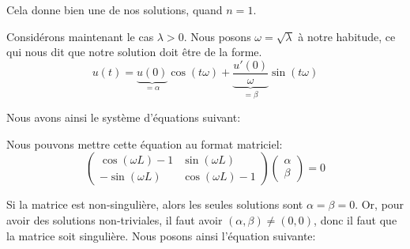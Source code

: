 \documentclass[a4paper]{article}
\begin{document}
{{        Cela donne bien une de nos solutions, quand $n = 1$.

        Considérons maintenant le cas $\lambda > 0$. Nous posons $\omega = \sqrt{\lambda}$ à notre habitude, ce qui nous dit que notre solution doit être de la forme. 
        \[u\left(t\right) = \underbrace{u\left(0\right)}_{= \alpha}\cos\left(t \omega\right) + \underbrace{\frac{u'\left(0\right)}{\omega}}_{= \beta} \sin\left(t \omega\right)\]
        
        Nous avons ainsi le système d'équations suivant: 
        
        Nous pouvons mettre cette équation au format matriciel: 
        \[\begin{pmatrix} \cos\left(\omega L\right) - 1 & \sin\left(\omega L\right) \\ -\sin\left(\omega L\right) & \cos\left(\omega L\right) - 1 \end{pmatrix} \begin{pmatrix} \alpha \\ \beta \end{pmatrix} = 0\]

        Si la matrice est non-singulière, alors les seules solutions sont $\alpha = \beta = 0$. Or, pour avoir des solutions non-triviales, il faut avoir $\left(\alpha, \beta\right) \neq \left(0, 0\right)$, donc il faut que la matrice soit singulière. Nous posons ainsi l'équation suivante: 
        
}}
\end{document}
